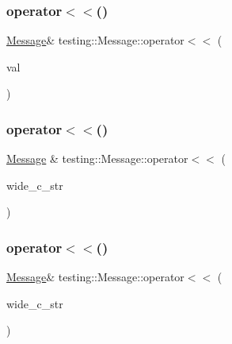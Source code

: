 \mbox{\label{classtesting_1_1_message_a3a71a1c1c8ea52de5852d75483d41453}} 
\subsubsection{\texorpdfstring{operator$<$$<$()}{operator<<()}\hspace{0.1cm}{\footnotesize\ttfamily [11/18]}}
{\footnotesize\ttfamily \mbox{\hyperlink{classtesting_1_1_message}{Message}}\& testing\+::\+Message\+::operator$<$$<$ (\begin{DoxyParamCaption}\item[{\mbox{\hyperlink{classtesting_1_1_message_ad398b70e2a11b923cef05c809b0eeb92}{Basic\+Narrow\+Io\+Manip}}}]{val }\end{DoxyParamCaption})\hspace{0.3cm}{\ttfamily [inline]}}

\mbox{\label{classtesting_1_1_message_ac0db9c22535b28bc863bfd0a1fdf7e14}} 
\subsubsection{\texorpdfstring{operator$<$$<$()}{operator<<()}\hspace{0.1cm}{\footnotesize\ttfamily [12/18]}}
{\footnotesize\ttfamily \mbox{\hyperlink{classtesting_1_1_message}{Message}} \& testing\+::\+Message\+::operator$<$$<$ (\begin{DoxyParamCaption}\item[{const wchar\+\_\+t $\ast$}]{wide\+\_\+c\+\_\+str }\end{DoxyParamCaption})}

\mbox{\label{classtesting_1_1_message_a34774e225944cb6df02db9689d312aae}} 
\subsubsection{\texorpdfstring{operator$<$$<$()}{operator<<()}\hspace{0.1cm}{\footnotesize\ttfamily [13/18]}}
{\footnotesize\ttfamily \mbox{\hyperlink{classtesting_1_1_message}{Message}}\& testing\+::\+Message\+::operator$<$$<$ (\begin{DoxyParamCaption}\item[{const wchar\+\_\+t $\ast$}]{wide\+\_\+c\+\_\+str }\end{DoxyParamCaption})}

